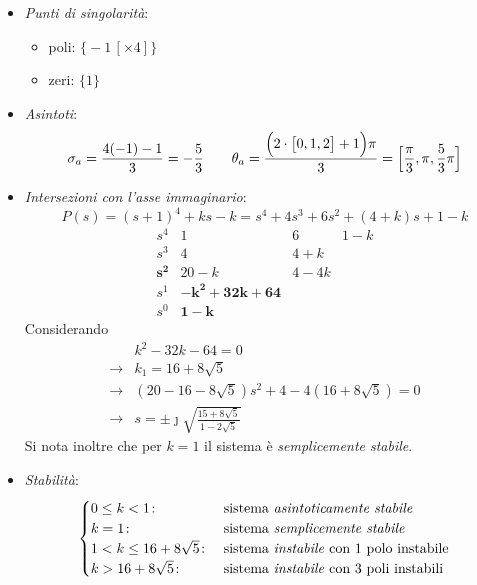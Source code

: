 \begin{esercizio}
\begin{itemize}
	\item \emph{Punti di singolarità}:
		\begin{itemize}
			\item poli: \(\bigl\{-1\,[\times 4]\bigr\}\)
			\item zeri: \(\bigl\{1\bigr\}\)
		\end{itemize}
	\item \emph{Asintoti}:
		\[
			\sigma_a = \frac{4(-1)-1}{3} = -\frac{5}{3} \qquad
			\theta_a = \frac{\Bigl(2\cdot\bigl[0,1,2\bigr]+1\Bigr)\pi}{3} = \Bigl[\frac{\pi}{3},\pi,\frac{5}{3}\pi\Bigr]
		\]
	\item \emph{Intersezioni con l'asse immaginario}:
		\[
			P(s) = (s+1)^4 +ks -k = s^4+4s^3+6s^2+(4+k)s+1-k
		\]
		\[\begin{array}{r|rrr}
			s^4 & 1 & 6 & 1-k \\
			s^3 & 4 & 4+k \\
			\bm{s^2} & 20-k & 4-4k \\
			s^1 & \bm{-k^2+32k+64} \\
			s^0 & \bm{1-k}
		\end{array}\]
		Considerando
		\begin{align*}
			& k^2-32k-64=0 \\
			\rightarrow & k_1 = 16+8\sqrt{5} \\
			\rightarrow & (20-16-8\sqrt{5})s^2 +4-4(16+8\sqrt{5}) =0 \\
			\rightarrow & s=\pm\jmath\sqrt{\frac{15+8\sqrt{5}}{1-2\sqrt{5}}}
		\end{align*}
		Si nota inoltre che per \(k=1\) il sistema è \emph{semplicemente stabile}.
	\item \emph{Stabilità}:
		\[\begin{cases}
			0 \leq k < 1\colon & \text{sistema \emph{asintoticamente stabile}} \\
			k = 1\colon & \text{sistema \emph{semplicemente stabile}} \\
			1 < k \leq 16+8\sqrt{5}\colon & \text{sistema \emph{instabile} con 1 polo instabile} \\
			k > 16+8\sqrt{5}\colon & \text{sistema \emph{instabile} con 3 poli instabili}
		\end{cases}\]
\end{itemize}
\end{esercizio}
